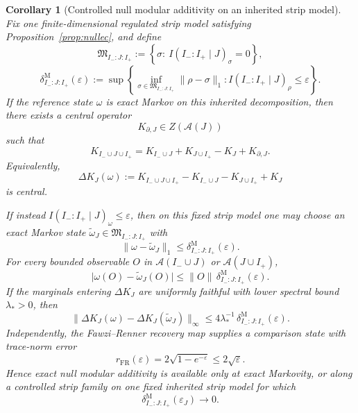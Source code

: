 \documentclass[11pt]{article}
\newtheorem{corollary}[theorem]{Corollary}
\begin{document}
\begin{corollary}[Controlled null modular additivity on an inherited strip model]\label{cor:n1}
Fix one finite-dimensional regulated strip model satisfying Proposition~\ref{prop:nullec}, and define
\[
\mathfrak M_{I_-:J:I_+}
:=
\left\{
\sigma:\ I(I_-:I_+\mid J)_\sigma=0
\right\},
\]
\[
\delta^{\mathrm M}_{I_-:J:I_+}(\varepsilon)
:=
\sup\left\{
\inf_{\sigma\in\mathfrak M_{I_-:J:I_+}}\|\rho-\sigma\|_1:
I(I_-:I_+\mid J)_\rho\le \varepsilon
\right\}.
\]
If the reference state \(\omega\) is exact Markov on this inherited decomposition, then there exists a central operator
\[
K_{\partial,J}\in Z(\mathcal A(J))
\]
such that
\[
K_{I_-\cup J\cup I_+}
=
K_{I_-\cup J}+K_{J\cup I_+}-K_J+K_{\partial,J}.
\]
Equivalently,
\[
\Delta K_J(\omega)
:=
K_{I_-\cup J\cup I_+}-K_{I_-\cup J}-K_{J\cup I_+}+K_J
\]
is central.

If instead \(I(I_-:I_+\mid J)_\omega\le \varepsilon\), then on this fixed strip model one may choose an exact Markov state \(\widetilde\omega_J\in \mathfrak M_{I_-:J:I_+}\) with
\[
\|\omega-\widetilde\omega_J\|_1
\le
\delta^{\mathrm M}_{I_-:J:I_+}(\varepsilon).
\]
For every bounded observable \(O\) in \(\mathcal A(I_-\cup J)\) or \(\mathcal A(J\cup I_+)\),
\[
\bigl|\omega(O)-\widetilde\omega_J(O)\bigr|
\le
\|O\|\,
\delta^{\mathrm M}_{I_-:J:I_+}(\varepsilon).
\]
If the marginals entering \(\Delta K_J\) are uniformly faithful with lower spectral bound \(\lambda_\ast>0\), then
\[
\|\Delta K_J(\omega)-\Delta K_J(\widetilde\omega_J)\|_\infty
\le
4\lambda_\ast^{-1}\,
\delta^{\mathrm M}_{I_-:J:I_+}(\varepsilon).
\]
Independently, the Fawzi--Renner recovery map supplies a comparison state with trace-norm error
\[
r_{\mathrm{FR}}(\varepsilon)
=
2\sqrt{1-e^{-\varepsilon}}
\le
2\sqrt{\varepsilon}.
\]
Hence exact null modular additivity is available only at exact Markovity, or along a controlled strip family on one fixed inherited strip model for which
\[
\delta^{\mathrm M}_{I_-:J:I_+}(\varepsilon_J)\to 0.
\]
\end{corollary}
\end{document}
